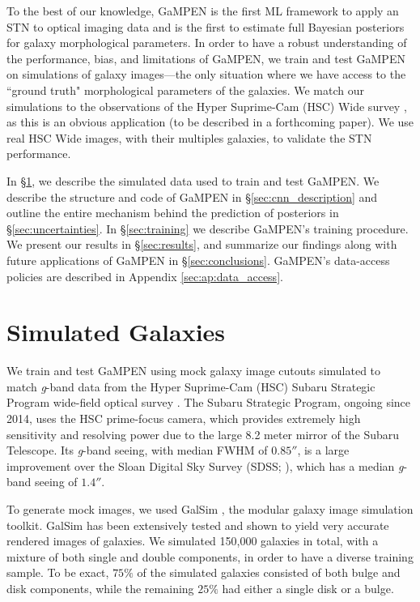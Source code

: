 \documentclass[twocolumn]{aastex63}
\newcommand\gampen{GaMPEN}
\begin{document}
\begin{CJK*}{UTF8}{gbsn}
To the best of our knowledge, \gampen{} is the first ML framework to apply an STN to optical imaging data and is the first to estimate full Bayesian posteriors for galaxy morphological parameters. In order to have a robust understanding of the performance, bias, and limitations of \gampen{}, we train and test \gampen{} on simulations of galaxy images---the only situation where we have access to the ``ground truth" morphological parameters of the galaxies. We match our simulations to the observations of the Hyper Suprime-Cam (HSC) Wide survey \citep{hsc_pdr1}, as this is an obvious application (to be described in a forthcoming paper).
We use real HSC Wide images, with their multiples galaxies, to validate the STN performance.


In \S \ref{sec:sim_data}, we describe the simulated data used to train and test \gampen{}. We describe the structure and code of \gampen{} in \S \ref{sec:cnn_description} and outline the entire mechanism behind the prediction of posteriors in \S \ref{sec:uncertainties}. In \S \ref{sec:training} we describe \gampen{}'s training procedure. We present our results in \S \ref{sec:results}, and summarize our findings along with future applications of \gampen{} in \S \ref{sec:conclusions}. \gampen{}'s data-access policies are described in Appendix  \ref{sec:ap:data_access}. 

\section{Simulated Galaxies} \label{sec:sim_data}
We train and test \gampen{} using mock galaxy image cutouts simulated to match \textit{g}-band data from the Hyper Suprime-Cam (HSC) Subaru Strategic Program wide-field optical survey \citep{hsc_pdr1}. The Subaru Strategic Program, ongoing since 2014, uses the HSC prime-focus camera, which provides extremely high sensitivity and resolving power due to the large 8.2 meter mirror of the Subaru Telescope. Its \textit{g}-band seeing, with median FWHM of $0.85''$, is a large improvement over the Sloan Digital Sky Survey (SDSS; \citealp{sdss_tech_summary}), which has a median \textit{g}-band seeing of $1.4''$.

To generate mock images, we used GalSim \citep{Rowe2015GalSim:Toolkit}, the modular galaxy image simulation toolkit. GalSim has been extensively tested and shown to yield very accurate rendered images of galaxies. We simulated 150,000 galaxies in total, with a mixture of both single and double components, in order to have a diverse training sample. To be exact, $75\%$ of the simulated galaxies consisted of both bulge and disk components, while the remaining $25\%$ had either a single disk or a bulge. 


\end{CJK*}
\end{document}
